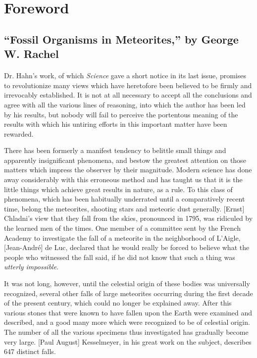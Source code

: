 \documentclass[a4paper, 12pt, oneside]{article}
\begin{document}
\setlength{\parskip}{1mm plus1mm minus1mm}
\setcounter{tocdepth}{3}
\setcounter{secnumdepth}{4}
\scriptsize
\tableofcontents
\clearpage
\listoffigures
\clearpage
\section{Foreword}
\subsection{``Fossil Organisms in Meteorites,'' by George W. Rachel}
\paragraph*{}
Dr. Hahn's work, of which \emph{Science} gave a short notice in its last issue, promises to revolutionize many views which have heretofore been believed to be firmly and irrevocably established. It is not at all necessary to accept all the conclusions and agree with all the various lines of reasoning, into which the author has been led by his results, but nobody will fail to perceive the portentous meaning of the results with which his untiring efforts in this important matter have been rewarded.

There has been formerly a manifest tendency to belittle small things and apparently insignificant phenomena, and bestow the greatest attention on those matters which impress the observer by their magnitude. Modern science has done away considerably with this erroneous method and has taught us that it is the little things which achieve great results in nature, as a rule. To this class of phenomena, which has been habitually underrated until a comparatively recent time, belong the meteorites, shooting stars and meteoric dust generally. [Ernst] Chladni's view that they fall from the skies, pronounced in 1795, was ridiculed by the learned men of the times. One member of a committee sent by the French Academy to investigate the fall of a meteorite in the neighborhood of L'Aigle, [Jean-André] de Luc, declared that he would really be forced to believe what the people who witnessed the fall said, if he did not know that such a thing was \emph{utterly impossible}.

It was not long, however, until the celestial origin of these bodies was universally recognized, several other falls of large meteorites occurring during the first decade of the present century, which could no longer be explained away. After this various stones that were known to have fallen upon the Earth were examined and described, and a good many more which were recognized to be of celestial origin. The number of all the various specimens thus investigated has gradually become very large. [Paul August] Kesselmeyer, in his great work on the subject, describes 647 distinct falls.
\end{document}
